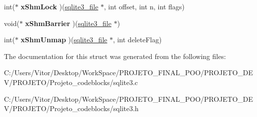 \begin{DoxyCompactItemize}
\item 
\hypertarget{structsqlite3__io__methods_a58f4a6b0df86440029cc5fa1b65b1b4e}{int($\ast$ {\bfseries x\-Shm\-Lock} )(\hyperlink{structsqlite3__file}{sqlite3\-\_\-file} $\ast$, int offset, int n, int flags)}\label{structsqlite3__io__methods_a58f4a6b0df86440029cc5fa1b65b1b4e}

\item 
\hypertarget{structsqlite3__io__methods_aedf4a59fa25ad33e0625a2aa0f6f2184}{void($\ast$ {\bfseries x\-Shm\-Barrier} )(\hyperlink{structsqlite3__file}{sqlite3\-\_\-file} $\ast$)}\label{structsqlite3__io__methods_aedf4a59fa25ad33e0625a2aa0f6f2184}

\item 
\hypertarget{structsqlite3__io__methods_af69cbc7ece1854576ac262f986871563}{int($\ast$ {\bfseries x\-Shm\-Unmap} )(\hyperlink{structsqlite3__file}{sqlite3\-\_\-file} $\ast$, int delete\-Flag)}\label{structsqlite3__io__methods_af69cbc7ece1854576ac262f986871563}

\end{DoxyCompactItemize}


The documentation for this struct was generated from the following files\-:\begin{DoxyCompactItemize}
\item 
C\-:/\-Users/\-Vitor/\-Desktop/\-Work\-Space/\-P\-R\-O\-J\-E\-T\-O\-\_\-\-F\-I\-N\-A\-L\-\_\-\-P\-O\-O/\-P\-R\-O\-J\-E\-T\-O\-\_\-\-D\-E\-V/\-P\-R\-O\-J\-E\-T\-O/\-Projeto\-\_\-codeblocks/sqlite3.\-c\item 
C\-:/\-Users/\-Vitor/\-Desktop/\-Work\-Space/\-P\-R\-O\-J\-E\-T\-O\-\_\-\-F\-I\-N\-A\-L\-\_\-\-P\-O\-O/\-P\-R\-O\-J\-E\-T\-O\-\_\-\-D\-E\-V/\-P\-R\-O\-J\-E\-T\-O/\-Projeto\-\_\-codeblocks/sqlite3.\-h\end{DoxyCompactItemize}

